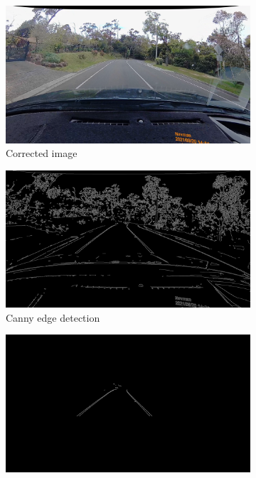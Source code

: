 \documentclass[11pt,twoside]{report}
\begin{document}
\begin{figure}[h]
\centering
\begin{subfigure}{0.4\textwidth}
	\includegraphics[width=\textwidth]{f008_corrected.png}
	\caption{Corrected image}
\end{subfigure}
\hfill
\begin{subfigure}{0.4\textwidth}
	\includegraphics[width=\textwidth]{f009_canny.png}
	\caption{Canny edge detection}
\end{subfigure}
\hfill
\begin{subfigure}{0.4\textwidth}
	\includegraphics[width=\textwidth]{f009_canny_cropped.png}

\end{subfigure}
\end{figure}
\end{document}
